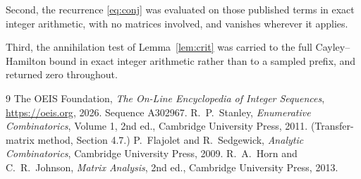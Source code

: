 \documentclass[11pt,a4paper]{article}
\theoremstyle{plain}
\theoremstyle{definition}
\begin{document}
Second, the recurrence \eqref{eq:conj} was evaluated on those published terms in exact
integer arithmetic, with no matrices involved, and vanishes wherever it applies.

Third, the annihilation test of Lemma~\ref{lem:crit} was carried to the full
Cayley--Hamilton bound in exact integer arithmetic rather than to a sampled prefix, and
returned zero throughout.

\begin{thebibliography}{9}
 The OEIS Foundation, \emph{The On-Line Encyclopedia of Integer
Sequences}, \url{https://oeis.org}, 2026. Sequence A302967.
 R.~P.~Stanley, \emph{Enumerative Combinatorics}, Volume 1, 2nd ed.,
Cambridge University Press, 2011. (Transfer-matrix method, Section 4.7.)
 P.~Flajolet and R.~Sedgewick, \emph{Analytic Combinatorics}, Cambridge
University Press, 2009.
 R.~A.~Horn and C.~R.~Johnson, \emph{Matrix Analysis}, 2nd ed., Cambridge
University Press, 2013.
\end{thebibliography}
\end{document}
